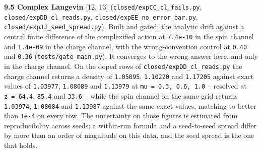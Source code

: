 \documentclass[10pt,letterpaper,twocolumn]{article}
\begin{document}
\textbf{9.5 Complex Langevin} {[}12, 13{]} (\texttt{closed/\allowbreak{}expCC\_\allowbreak{}cl\_\allowbreak{}fails.\allowbreak{}py}, \texttt{closed/\allowbreak{}expDD\_\allowbreak{}cl\_\allowbreak{}reads.\allowbreak{}py},
\texttt{closed/\allowbreak{}expEE\_\allowbreak{}no\_\allowbreak{}error\_\allowbreak{}bar.\allowbreak{}py}, \texttt{closed/\allowbreak{}expJJ\_\allowbreak{}seed\_\allowbreak{}spread.\allowbreak{}py}). Built and gated: the analytic
drift against a central finite difference of the complexified action at \texttt{7.\allowbreak{}4e-{}\allowbreak{}10} in the spin
channel and \texttt{1.\allowbreak{}4e-{}\allowbreak{}09} in the charge channel, with the wrong-convention control at \texttt{0.\allowbreak{}40} and
\texttt{0.\allowbreak{}36} (\texttt{tests/\allowbreak{}gate\_\allowbreak{}main.\allowbreak{}py}). It converges to the wrong answer here, and only in the charge
channel. On the doped rows of \texttt{closed/\allowbreak{}expDD\_\allowbreak{}cl\_\allowbreak{}reads.\allowbreak{}py} the charge channel returns a density of
\texttt{1.\allowbreak{}05095}, \texttt{1.\allowbreak{}10220} and \texttt{1.\allowbreak{}17205} against exact values of \texttt{1.\allowbreak{}03977}, \texttt{1.\allowbreak{}08089} and \texttt{1.\allowbreak{}13979} at
\texttt{mu\ =\allowbreak{}\ 0.\allowbreak{}3,\allowbreak{}\ 0.\allowbreak{}6,\allowbreak{}\ 1.\allowbreak{}0} -- resolved at \texttt{z\ =\allowbreak{}\ 64.\allowbreak{}4}, \texttt{85.\allowbreak{}4} and \texttt{33.\allowbreak{}6} -- while the spin channel on the
same grid returns \texttt{1.\allowbreak{}03974}, \texttt{1.\allowbreak{}08084} and \texttt{1.\allowbreak{}13987} against the same exact values, matching to
better than \texttt{1e-{}\allowbreak{}4} on every row. The uncertainty on those figures is estimated from reproducibility
across seeds; a within-run
formula and a seed-to-seed spread differ by more than an order of magnitude on this data, and the
seed spread is the one that holds.
\end{document}
